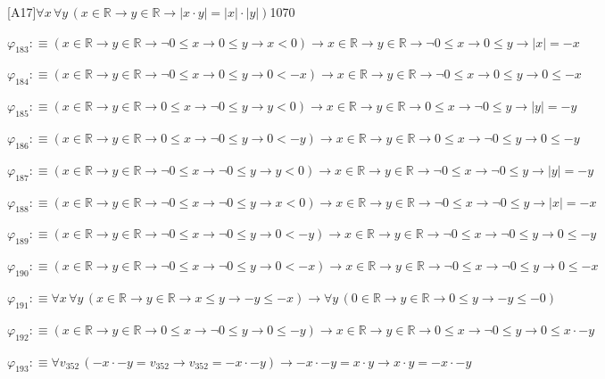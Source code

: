 \begin{fullproof}{[A17]}{$\forall x\,\forall y\,(x \in \mathbb{R} \to y \in \mathbb{R} \to \lvert x \cdot y \rvert = \lvert x \rvert \cdot \lvert y \rvert)$}{1070}
\begin{abbrevlist}
\item $\varphi_{183} :\equiv (x \in \mathbb{R} \to y \in \mathbb{R} \to \neg 0 \leq x \to 0 \leq y \to x < 0) \to x \in \mathbb{R} \to y \in \mathbb{R} \to \neg 0 \leq x \to 0 \leq y \to \lvert x \rvert = -x$
\item $\varphi_{184} :\equiv (x \in \mathbb{R} \to y \in \mathbb{R} \to \neg 0 \leq x \to 0 \leq y \to 0 < -x) \to x \in \mathbb{R} \to y \in \mathbb{R} \to \neg 0 \leq x \to 0 \leq y \to 0 \leq -x$
\item $\varphi_{185} :\equiv (x \in \mathbb{R} \to y \in \mathbb{R} \to 0 \leq x \to \neg 0 \leq y \to y < 0) \to x \in \mathbb{R} \to y \in \mathbb{R} \to 0 \leq x \to \neg 0 \leq y \to \lvert y \rvert = -y$
\item $\varphi_{186} :\equiv (x \in \mathbb{R} \to y \in \mathbb{R} \to 0 \leq x \to \neg 0 \leq y \to 0 < -y) \to x \in \mathbb{R} \to y \in \mathbb{R} \to 0 \leq x \to \neg 0 \leq y \to 0 \leq -y$
\item $\varphi_{187} :\equiv (x \in \mathbb{R} \to y \in \mathbb{R} \to \neg 0 \leq x \to \neg 0 \leq y \to y < 0) \to x \in \mathbb{R} \to y \in \mathbb{R} \to \neg 0 \leq x \to \neg 0 \leq y \to \lvert y \rvert = -y$
\item $\varphi_{188} :\equiv (x \in \mathbb{R} \to y \in \mathbb{R} \to \neg 0 \leq x \to \neg 0 \leq y \to x < 0) \to x \in \mathbb{R} \to y \in \mathbb{R} \to \neg 0 \leq x \to \neg 0 \leq y \to \lvert x \rvert = -x$
\item $\varphi_{189} :\equiv (x \in \mathbb{R} \to y \in \mathbb{R} \to \neg 0 \leq x \to \neg 0 \leq y \to 0 < -y) \to x \in \mathbb{R} \to y \in \mathbb{R} \to \neg 0 \leq x \to \neg 0 \leq y \to 0 \leq -y$
\item $\varphi_{190} :\equiv (x \in \mathbb{R} \to y \in \mathbb{R} \to \neg 0 \leq x \to \neg 0 \leq y \to 0 < -x) \to x \in \mathbb{R} \to y \in \mathbb{R} \to \neg 0 \leq x \to \neg 0 \leq y \to 0 \leq -x$
\item $\varphi_{191} :\equiv \forall x\,\forall y\,(x \in \mathbb{R} \to y \in \mathbb{R} \to x \leq y \to -y \leq -x) \to \forall y\,(0 \in \mathbb{R} \to y \in \mathbb{R} \to 0 \leq y \to -y \leq -0)$
\item $\varphi_{192} :\equiv (x \in \mathbb{R} \to y \in \mathbb{R} \to 0 \leq x \to \neg 0 \leq y \to 0 \leq -y) \to x \in \mathbb{R} \to y \in \mathbb{R} \to 0 \leq x \to \neg 0 \leq y \to 0 \leq x \cdot -y$
\item $\varphi_{193} :\equiv \forall v_{352}\,(-x \cdot -y = v_{352} \to v_{352} = -x \cdot -y) \to -x \cdot -y = x \cdot y \to x \cdot y = -x \cdot -y$

\end{abbrevlist}
\end{fullproof}
